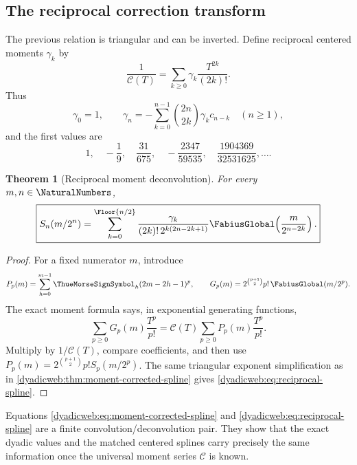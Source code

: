 \documentclass[11pt,oneside]{article}
\newtheorem{theorem}{Theorem}[section]
\theoremstyle{definition}
\theoremstyle{remark}
\begin{document}
\subsection{The reciprocal correction transform}

The previous relation is triangular and can be inverted.  Define reciprocal centered moments
$\gamma_k$ by
\begin{equation}
 \frac1{\mathscr C(T)}=
 \sum_{k\ge0}\gamma_k\frac{T^{2k}}{(2k)!}.                \label{dyadicweb:eq:gamma-def}
\end{equation}
Thus
\begin{equation}
 \gamma_0=1,
 \qquad
 \gamma_n=-\sum_{k=0}^{n-1}\binom{2n}{2k}\gamma_kc_{n-k}
 \quad(n\ge1),                                             \label{dyadicweb:eq:gamma-recurrence}
\end{equation}
and the first values are
\begin{equation}
 1,\quad-\frac19,\quad\frac{31}{675},\quad
 -\frac{2347}{59535},\quad\frac{1904369}{32531625},\ldots. \label{dyadicweb:eq:gamma-values}
\end{equation}

\begin{theorem}[Reciprocal moment deconvolution]
\label{dyadicweb:thm:reciprocal-spline}
For every $m,n\in\NaturalNumbers$,
\begin{equation}
 \boxed{
 S_n(m/2^n)=
 \sum_{k=0}^{\Floor{n/2}}
 \frac{\gamma_k}{(2k)!\,2^{k(2n-2k+1)}}
 \FabiusGlobal\!\left(\frac{m}{2^{n-2k}}\right).}            \label{dyadicweb:eq:reciprocal-spline}
\end{equation}
\end{theorem}

\begin{proof}
For a fixed numerator $m$, introduce
\[
 P_p(m)=\sum_{h=0}^{m-1}\ThueMorseSignSymbol_h(2m-2h-1)^p,
 \qquad
 G_p(m)=2^{\binom{p+1}{2}}p!\,\FabiusGlobal(m/2^p).
\]
The exact moment formula says, in exponential generating functions,
\[
 \sum_{p\ge0}G_p(m)\frac{T^p}{p!}
 =\mathscr C(T)\sum_{p\ge0}P_p(m)\frac{T^p}{p!}.
\]
Multiply by $1/\mathscr C(T)$, compare coefficients, and then use
$P_p(m)=2^{\binom{p+1}{2}}p!S_p(m/2^p)$.  The same triangular exponent simplification as in
\cref{dyadicweb:thm:moment-corrected-spline} gives \eqref{dyadicweb:eq:reciprocal-spline}.
\end{proof}

Equations \eqref{dyadicweb:eq:moment-corrected-spline} and \eqref{dyadicweb:eq:reciprocal-spline} are a finite
convolution/deconvolution pair.  They show that the exact dyadic values and the matched centered
splines carry precisely the same information once the universal moment series $\mathscr C$ is
known.
\end{document}
